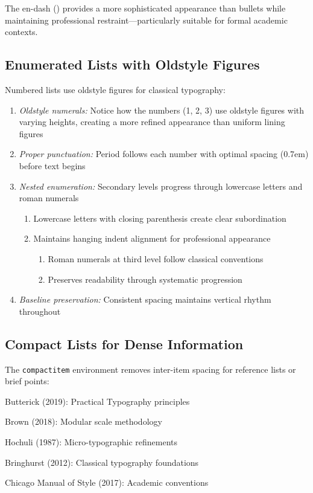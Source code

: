 \documentclass[11pt]{article}
\begin{document}
The en-dash (\textendash) provides a more sophisticated appearance than bullets while maintaining professional restraint—particularly suitable for formal academic contexts.

\subsection{Enumerated Lists with Oldstyle Figures}

Numbered lists use oldstyle figures for classical typography:

\begin{enumerate}
\item \emph{Oldstyle numerals:} Notice how the numbers (1, 2, 3) use oldstyle figures with varying heights, creating a more refined appearance than uniform lining figures
\item \emph{Proper punctuation:} Period follows each number with optimal spacing (0.7em) before text begins
\item \emph{Nested enumeration:} Secondary levels progress through lowercase letters and roman numerals
  \begin{enumerate}
  \item Lowercase letters with closing parenthesis create clear subordination
  \item Maintains hanging indent alignment for professional appearance
    \begin{enumerate}
    \item Roman numerals at third level follow classical conventions
    \item Preserves readability through systematic progression
    \end{enumerate}
  \end{enumerate}
\item \emph{Baseline preservation:} Consistent spacing maintains vertical rhythm throughout
\end{enumerate}

\subsection{Compact Lists for Dense Information}

The \texttt{compactitem} environment removes inter-item spacing for reference lists or brief points:

\begin{compactitem}
\item Butterick (2019): Practical Typography principles
\item Brown (2018): Modular scale methodology  
\item Hochuli (1987): Micro-typographic refinements
\item Bringhurst (2012): Classical typography foundations
\item Chicago Manual of Style (2017): Academic conventions
\end{compactitem}
\end{document}
